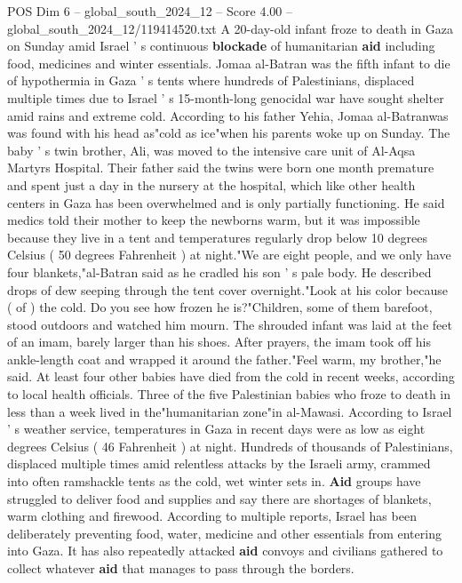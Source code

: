 \begin{textsample}{POS Dim 6 – global\_south\_2024\_12 – Score 4.00 – global\_south\_2024\_12/119414520.txt}  \label{ex:f6_pos_325}
A 20-day-old infant froze to death in Gaza on Sunday amid Israel ' s continuous \textbf{blockade} of humanitarian \textbf{aid} including food, medicines and winter essentials.
Jomaa al-Batran was the fifth infant to die of hypothermia in Gaza ' s tents where hundreds of Palestinians, displaced multiple times due to Israel ' s 15-month-long genocidal war have sought shelter amid rains and extreme cold.
According to his father Yehia, Jomaa al-Batranwas was found with his head as"cold as ice"when his parents woke up on Sunday.
The baby ' s twin brother, Ali, was moved to the intensive care unit of Al-Aqsa Martyrs Hospital.
Their father said the twins were born one month premature and spent just a day in the nursery at the hospital, which like other health centers in Gaza has been overwhelmed and is only partially functioning.
He said medics told their mother to keep the newborns warm, but it was impossible because they live in a tent and temperatures regularly drop below 10 degrees Celsius ( 50 degrees Fahrenheit ) at night."We are eight people, and we only have four blankets,"al-Batran said as he cradled his son ' s pale body.
He described drops of dew seeping through the tent cover overnight."Look at his color because ( of ) the cold.
Do you see how frozen he is?"Children, some of them barefoot, stood outdoors and watched him mourn.
The shrouded infant was laid at the feet of an imam, barely larger than his shoes.
After prayers, the imam took off his ankle-length coat and wrapped it around the father."Feel warm, my brother,"he said.
At least four other babies have died from the cold in recent weeks, according to local health officials.
Three of the five Palestinian babies who froze to death in less than a week lived in the"humanitarian zone"in al-Mawasi.
According to Israel ' s weather service, temperatures in Gaza in recent days were as low as eight degrees Celsius ( 46 Fahrenheit ) at night.
Hundreds of thousands of Palestinians, displaced multiple times amid relentless attacks by the Israeli army, crammed into often ramshackle tents as the cold, wet winter sets in. \textbf{Aid} groups have struggled to deliver food and supplies and say there are shortages of blankets, warm clothing and firewood.
According to multiple reports, Israel has been deliberately preventing food, water, medicine and other essentials from entering into Gaza.
It has also repeatedly attacked \textbf{aid} convoys and civilians gathered to collect whatever \textbf{aid} that manages to pass through the borders.

\end{textsample}
